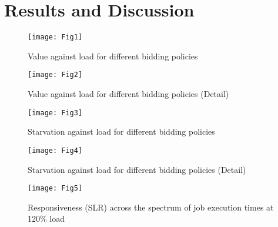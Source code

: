 \documentclass[english,british]{IEEEtran}
\begin{document}
\section{Results and Discussion}

\begin{figure}
\begin{centering}
\texttt{[image: Fig1]}
\par\end{centering}

\protect\caption{Value against load for different bidding policies\label{fig:Value-against-load}}


\end{figure}


\begin{figure}
\begin{centering}
\texttt{[image: Fig2]}
\par\end{centering}

\protect\caption{Value against load for different bidding policies (Detail)\label{fig:Value-against-load-zoom}}
\end{figure}


\begin{figure}
\begin{centering}
\texttt{[image: Fig3]}
\par\end{centering}

\protect\caption{Starvation against load for different bidding policies\label{fig:Starvation-against-load}}
\end{figure}


\begin{figure}
\begin{centering}
\texttt{[image: Fig4]}
\par\end{centering}

\protect\caption{Starvation against load for different bidding policies (Detail)\label{fig:Starvation-against-load-zoom}}
\end{figure}


\begin{figure}
\begin{centering}
\texttt{[image: Fig5]}
\par\end{centering}

\protect\caption{Responsiveness (SLR) across the spectrum of job execution times at
120\% load\label{fig:Responsiveness-decile}}
\end{figure}
\end{document}
